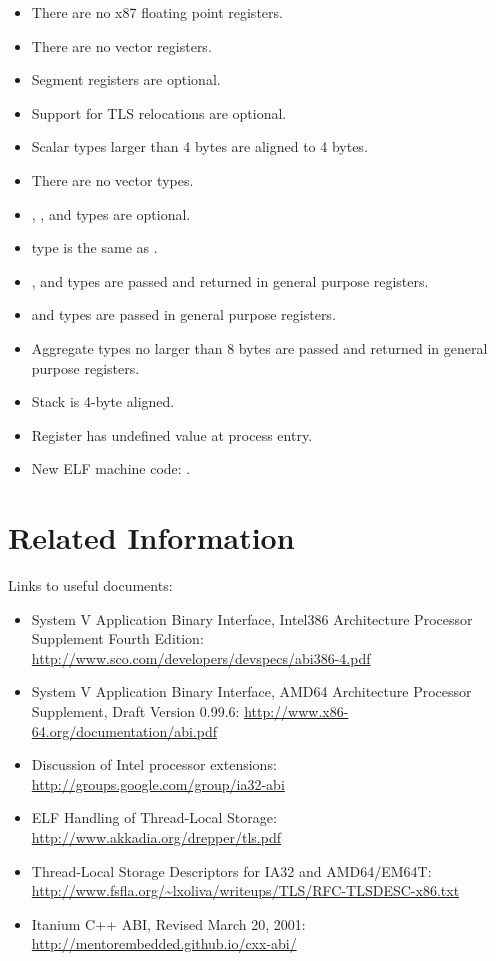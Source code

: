 \begin{itemize}
  \item There are no x87 floating point registers.
  \item There are no vector registers.
  \item Segment registers are optional.
  \item Support for TLS relocations are optional.
  \item Scalar types larger than 4 bytes are aligned to 4 bytes.
  \item There are no vector types.
  \item {}, , and 
	types are optional.
  \item {} type is the same as .
  \item {},  and  types are
	passed and returned in general purpose registers.
  \item {} and  types are passed
	in general purpose registers.
  \item Aggregate types no larger than 8 bytes are passed and returned
	in general purpose registers.
  \item Stack is 4-byte aligned.
  \item Register \EDX has undefined value at process entry.
  \item New ELF machine code: .
\end{itemize}


\section{Related Information}

Links to useful documents:
\begin{itemize}
 \item System V Application Binary Interface, Intel386{\texttrademark} Architecture
       Processor Supplement Fourth Edition:
       \url{http://www.sco.com/developers/devspecs/abi386-4.pdf}
 \item System V Application Binary Interface, AMD64 Architecture Processor
       Supplement, Draft Version 0.99.6:
       \url{http://www.x86-64.org/documentation/abi.pdf}
 \item Discussion of Intel processor extensions:
       \url{http://groups.google.com/group/ia32-abi}
 \item ELF Handling of Thread-Local Storage:
       \url{http://www.akkadia.org/drepper/tls.pdf}
 \item Thread-Local Storage Descriptors for IA32 and AMD64/EM64T:
       \url{http://www.fsfla.org/~lxoliva/writeups/TLS/RFC-TLSDESC-x86.txt}
 \item Itanium C++ ABI, Revised March 20, 2001:
       \url{http://mentorembedded.github.io/cxx-abi/}
\end{itemize}


